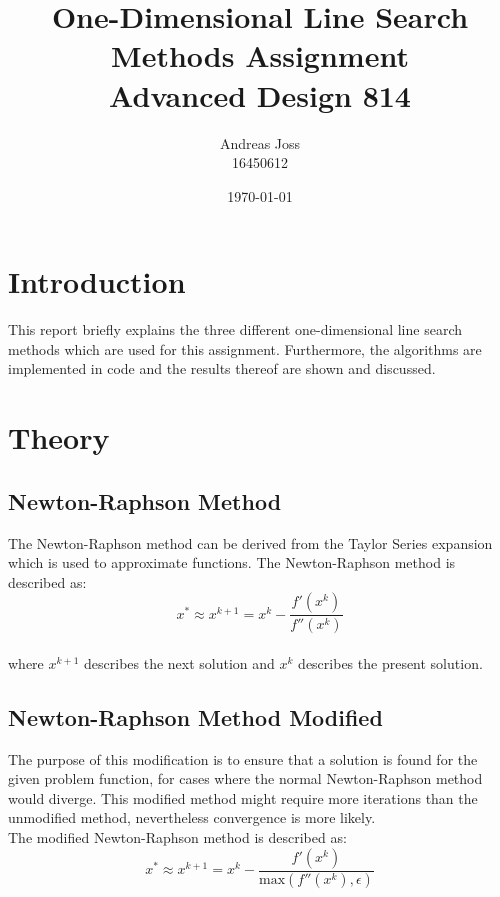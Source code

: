 \documentclass[a4paper,10pt]{article}
\title{\Huge{One-Dimensional Line Search Methods Assignment}\\[7cm]Advanced Design 814\\[2cm]}
\author{\Large Andreas Joss\\[0.5cm]16450612}
\date{\today}
\begin{document}
\maketitle


\newpage
\section{Introduction}
This report briefly explains the  three different one-dimensional line search methods which are used for this assignment. Furthermore, the algorithms are implemented in code and the results thereof are shown and discussed. 

\section{Theory}
\subsection{Newton-Raphson Method}
The Newton-Raphson method can be derived from the Taylor Series expansion which is used to approximate functions. The Newton-Raphson method is described as:
 \begin{equation}\label{eq:1}
  x^{*} \approx x^{k+1} = x^{k} - \frac{f'(x^{k})}{f''(x^{k})}
 \end{equation}
\\[0.5cm]

where $x^{k+1}$ describes the next solution and $x^{k}$ describes the present solution.

\subsection{Newton-Raphson Method Modified}
The purpose of this modification is to ensure that a solution is found for the given problem function, for cases where the normal Newton-Raphson method would diverge. This modified method might require more iterations than the unmodified method, nevertheless convergence is more likely.
\\[0.5cm]
The modified Newton-Raphson method is described as:
 \begin{equation}\label{eq:2}
  x^{*} \approx x^{k+1} = x^{k} - \frac{f'(x^{k})}{\text{max}(f''(x^{k}),\epsilon)}
 \end{equation}
\\[0.1cm]
\end{document}
